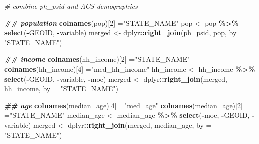 \documentclass[
]{article}
\newenvironment{Shaded}{\begin{snugshade}}{\end{snugshade}}
\newcommand{\AttributeTok}[1]{\textcolor[rgb]{0.13,0.29,0.53}{#1}}
\newcommand{\CommentTok}[1]{\textcolor[rgb]{0.56,0.35,0.01}{\textit{#1}}}
\newcommand{\DecValTok}[1]{\textcolor[rgb]{0.00,0.00,0.81}{#1}}
\newcommand{\DocumentationTok}[1]{\textcolor[rgb]{0.56,0.35,0.01}{\textbf{\textit{#1}}}}
\newcommand{\FunctionTok}[1]{\textcolor[rgb]{0.13,0.29,0.53}{\textbf{#1}}}
\newcommand{\NormalTok}[1]{#1}
\newcommand{\OtherTok}[1]{\textcolor[rgb]{0.56,0.35,0.01}{#1}}
\newcommand{\SpecialCharTok}[1]{\textcolor[rgb]{0.81,0.36,0.00}{\textbf{#1}}}
\newcommand{\StringTok}[1]{\textcolor[rgb]{0.31,0.60,0.02}{#1}}
\begin{document}
\begin{Shaded}
\begin{Highlighting}[]
\CommentTok{\# combine ph\_psid and ACS demographics}

\DocumentationTok{\#\# population}
\FunctionTok{colnames}\NormalTok{(pop)[}\DecValTok{2}\NormalTok{] }\OtherTok{=}\StringTok{"STATE\_NAME"}
\NormalTok{pop }\OtherTok{\textless{}{-}}\NormalTok{ pop }\SpecialCharTok{\%\textgreater{}\%} \FunctionTok{select}\NormalTok{(}\SpecialCharTok{{-}}\NormalTok{GEOID, }\SpecialCharTok{{-}}\NormalTok{variable)}
\NormalTok{merged }\OtherTok{\textless{}{-}}\NormalTok{ dplyr}\SpecialCharTok{::}\FunctionTok{right\_join}\NormalTok{(ph\_psid, pop, }\AttributeTok{by =} \StringTok{"STATE\_NAME"}\NormalTok{)}

\DocumentationTok{\#\# income}
\FunctionTok{colnames}\NormalTok{(hh\_income)[}\DecValTok{2}\NormalTok{] }\OtherTok{=}\StringTok{"STATE\_NAME"}
\FunctionTok{colnames}\NormalTok{(hh\_income)[}\DecValTok{4}\NormalTok{] }\OtherTok{=}\StringTok{"med\_hh\_income"}
\NormalTok{hh\_income }\OtherTok{\textless{}{-}}\NormalTok{ hh\_income }\SpecialCharTok{\%\textgreater{}\%} \FunctionTok{select}\NormalTok{(}\SpecialCharTok{{-}}\NormalTok{GEOID, }\SpecialCharTok{{-}}\NormalTok{variable, }\SpecialCharTok{{-}}\NormalTok{moe)}
\NormalTok{merged }\OtherTok{\textless{}{-}}\NormalTok{ dplyr}\SpecialCharTok{::}\FunctionTok{right\_join}\NormalTok{(merged, hh\_income, }\AttributeTok{by =} \StringTok{"STATE\_NAME"}\NormalTok{)}

\DocumentationTok{\#\# age}
\FunctionTok{colnames}\NormalTok{(median\_age)[}\DecValTok{4}\NormalTok{] }\OtherTok{=}\StringTok{"med\_age"}
\FunctionTok{colnames}\NormalTok{(median\_age)[}\DecValTok{2}\NormalTok{] }\OtherTok{=}\StringTok{"STATE\_NAME"}
\NormalTok{median\_age }\OtherTok{\textless{}{-}}\NormalTok{ median\_age }\SpecialCharTok{\%\textgreater{}\%} \FunctionTok{select}\NormalTok{(}\SpecialCharTok{{-}}\NormalTok{moe, }\SpecialCharTok{{-}}\NormalTok{GEOID, }\SpecialCharTok{{-}}\NormalTok{variable)}
\NormalTok{merged }\OtherTok{\textless{}{-}}\NormalTok{ dplyr}\SpecialCharTok{::}\FunctionTok{right\_join}\NormalTok{(merged, median\_age, }\AttributeTok{by =} \StringTok{"STATE\_NAME"}\NormalTok{)}


\end{Highlighting}
\end{Shaded}
\end{document}
